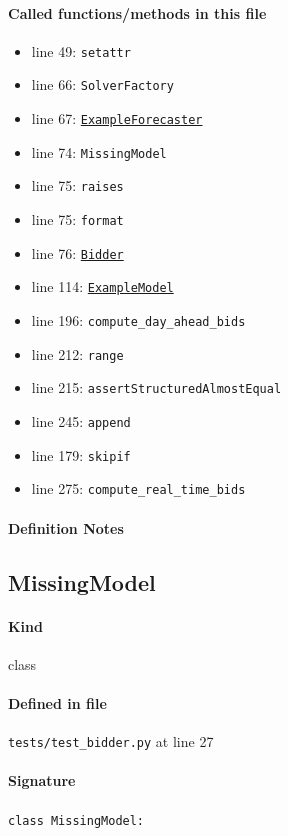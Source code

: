 \documentclass[11pt]{report}
\begin{document}
\paragraph{Called functions/methods in this file}
\begin{itemize}[leftmargin=*]
  \item line 49: \texttt{setattr}
  \item line 66: \texttt{SolverFactory}
  \item line 67: \hyperref[def:tests-util.py:ExampleForecaster:L259]{\texttt{ExampleForecaster}}
  \item line 74: \texttt{MissingModel}
  \item line 75: \texttt{raises}
  \item line 75: \texttt{format}
  \item line 76: \hyperref[def:bidder.py:Bidder:L1000]{\texttt{Bidder}}
  \item line 114: \hyperref[def:tests-util.py:ExampleModel:L25]{\texttt{ExampleModel}}
  \item line 196: \texttt{compute\_day\_ahead\_bids}
  \item line 212: \texttt{range}
  \item line 215: \texttt{assertStructuredAlmostEqual}
  \item line 245: \texttt{append}
  \item line 179: \texttt{skipif}
  \item line 275: \texttt{compute\_real\_time\_bids}
\end{itemize}
\paragraph{Definition Notes}
\subsection{MissingModel}
\label{def:tests-test_bidder.py:MissingModel:L27}
\paragraph{Kind} class
\paragraph{Defined in file} \texttt{tests/test\_bidder.py} at line 27
\paragraph{Signature} \texttt{class MissingModel:}
\end{document}
